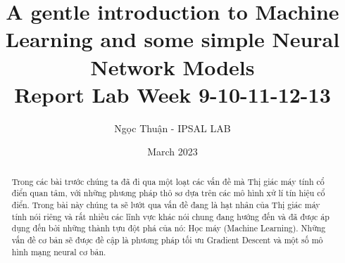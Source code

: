 \documentclass{article}
\title{A gentle introduction to Machine Learning and some simple Neural Network Models \\ \Large Report Lab Week 9-10-11-12-13}
\author{Ngọc Thuận - IPSAL LAB}
\date{March 2023}
\begin{document}
\maketitle
\begin{abstract}
Trong các bài trước chúng ta đã đi qua một loạt các vấn đề mà Thị giác máy tính cổ điển quan tâm, với những phương pháp thô sơ dựa trên các mô hình xử lí tín hiệu cổ điển. Trong bài này chúng ta sẽ lướt qua vấn đề đang là hạt nhân của Thị giác máy tính nói riêng và rất nhiều các lĩnh vực khác nói chung đang hướng đến và đã được áp dụng đến bởi những thành tựu đột phá của nó: Học máy (Machine Learning). Những vấn đề cơ bản sẽ được đề cập là phương pháp tối ưu Gradient Descent và một số mô hình mạng neural cơ bản.   
\end{abstract}
\tableofcontents
\newpage
\end{document}
